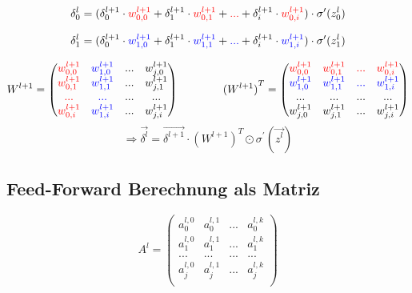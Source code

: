 \documentclass{article}
\begin{document}
\[ \delta_0^l = (\delta_0^{l+1} \cdot \textcolor{red}{w_{0,0}^{l+1}} + \delta_1^{l+1} \cdot \textcolor{red}{w_{0,1}^{l+1}}
 + \textcolor{red}{...} + \delta_i^{l+1} \cdot \textcolor{red}{w_{0,i}^{l+1}}) \cdot \sigma^{\prime}(z_0^{l}) \]

 \[ \delta_1^l = (\delta_0^{l+1} \cdot \textcolor{blue}{w_{1,0}^{l+1}} + \delta_1^{l+1} \cdot \textcolor{blue}{w_{1,1}^{l+1}}
 + \textcolor{blue}{...} + \delta_i^{l+1} \cdot \textcolor{blue}{w_{1,i}^{l+1}}) \cdot \sigma^{\prime}(z_1^{l}) \]

\[ W^{l+1} = \begin{pmatrix}
    \textcolor{red}{w_{0,0}^{l+1}} & \textcolor{blue}{w_{1,0}^{l+1}} & ... & w_{j,0}^{l+1} \\
    \textcolor{red}{w_{0,1}^{l+1}} & \textcolor{blue}{w_{1,1}^{l+1}} & ... & w_{j,1}^{l+1} \\
    \textcolor{red}{...} & \textcolor{blue}{...} & ... & ... \\
    \textcolor{red}{w_{0,i}^{l+1}} & \textcolor{blue}{w_{1,i}^{l+1}} & ... & w_{j,i}^{l+1}
\end{pmatrix} 
\kern 40pt
{(W^{l+1})}^T = \begin{pmatrix}
    \textcolor{red}{w_{0,0}^{l+1}} & \textcolor{red}{w_{0,1}^{l+1}} & \textcolor{red}{...} & \textcolor{red}{w_{0,i}^{l+1}} \\
    \textcolor{blue}{w_{1,0}^{l+1}} & \textcolor{blue}{w_{1,1}^{l+1}} & \textcolor{blue}{...} & \textcolor{blue}{w_{1,i}^{l+1}} \\
    ... & ... & ... & ... \\
    w_{j,0}^{l+1} & w_{j,1}^{l+1} & ... & w_{j,i}^{l+1} 
\end{pmatrix} \]
\[ \Rightarrow \vec{\delta^l} = \vec{\delta^{l+1}} \cdot {(W^{l+1})}^T \odot \sigma^{\prime}(\vec{z^l}) \]


 \subsection{Feed-Forward Berechnung als Matriz}

 \[ A^l = 
 \begin{pmatrix}
    a_0^{l,0} & a_0^{l,1} & ... & a_0^{l,k} \\
    a_1^{l,0} & a_1^{l,1} & ... & a_1^{l,k} \\
    ... & ... & ... & ... \\
    a_j^{l,0} & a_j^{l,1} & ... & a_j^{l,k} \\
 \end{pmatrix} \]
\end{document}
